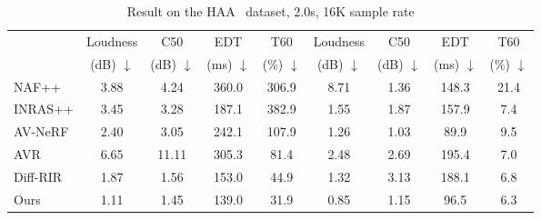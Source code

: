 \documentclass[letterpaper]{article} %
\begin{document}
\begin{table*}[ht!]
\begin{tabular}{l cccc cccc}
         &Loudness & C50 & EDT & T60 &Loudness & C50 & EDT & T60   \\
         & (dB) $\downarrow$ & (dB) $\downarrow$ & (ms) $\downarrow$ & (\%) $\downarrow$ & (dB) $\downarrow$ & (dB) $\downarrow$ & (ms) $\downarrow$ & (\%) $\downarrow$ \\
         \midrule
        NAF++ \cite{luo2022learning}  &  3.88 & 4.24 & 360.0 & 306.9 & 8.71 & 1.36 & 148.3 & 21.4 \\
        INRAS++ \cite{su2022inras} & 3.45 & 3.28 & 187.1& 382.9 & 1.55 &  1.87 & 157.9 & 7.4\\
        AV-NeRF \cite{liang23avnerf} & 2.40 & 3.05 &  242.1 & 107.9 & \cellcolor{lemonchiffon}1.26 & \cellcolor{grannysmithapple} 1.03 &  \cellcolor{grannysmithapple} 89.9 &  9.5  \\
        AVR \cite{avr} & 6.65 & 11.11 & 305.3 & 81.4 & 2.48 & 2.69 & 195.4  &  7.0\\
        Diff-RIR \cite{hearinganythinganywhere2024} & \cellcolor{lemonchiffon}1.87 & \cellcolor{lemonchiffon}1.56 & \cellcolor{lemonchiffon}153.0 & \cellcolor{lemonchiffon}44.9 &  1.32 &   3.13 & 188.1 & \cellcolor{lemonchiffon}6.8\\
        \midrule
        Ours& \cellcolor{grannysmithapple}1.11  & \cellcolor{grannysmithapple}1.45 & \cellcolor{grannysmithapple}139.0 & \cellcolor{grannysmithapple}31.9 & \cellcolor{grannysmithapple}0.85 & \cellcolor{lemonchiffon}1.15 & \cellcolor{lemonchiffon}96.5 & \cellcolor{grannysmithapple}6.3 \\
        \bottomrule
    \end{tabular}
    \caption{{Result on the HAA~\cite{hearinganythinganywhere2024} dataset}, 2.0s, 16K sample rate}
    \label{tab:exp-diffrir1-supp}
\end{table*}
\end{document}
